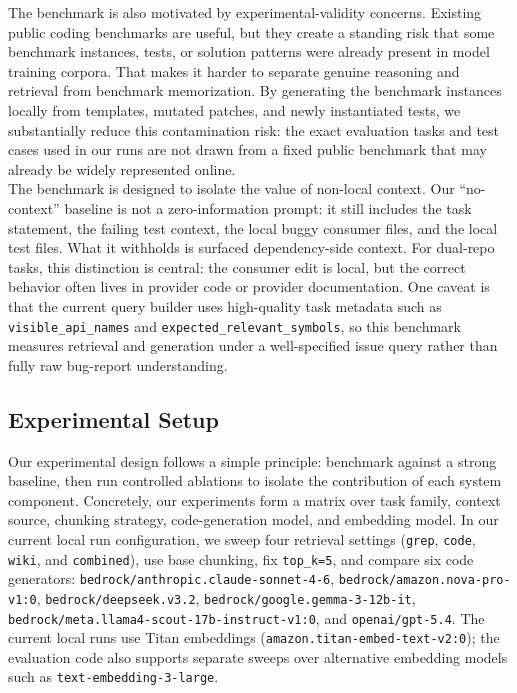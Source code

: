 \documentclass[a4paper,12pt]{article}
\begin{document}
The benchmark is also motivated by experimental-validity concerns. Existing public coding benchmarks are useful, but they create a standing risk that some benchmark instances, tests, or solution patterns were already present in model training corpora. That makes it harder to separate genuine reasoning and retrieval from benchmark memorization. By generating the benchmark instances locally from templates, mutated patches, and newly instantiated tests, we substantially reduce this contamination risk: the exact evaluation tasks and test cases used in our runs are not drawn from a fixed public benchmark that may already be widely represented online.\\

The benchmark is designed to isolate the value of non-local context. Our ``no-context'' baseline is not a zero-information prompt: it still includes the task statement, the failing test context, the local buggy consumer files, and the local test files. What it withholds is surfaced dependency-side context. For dual-repo tasks, this distinction is central: the consumer edit is local, but the correct behavior often lives in provider code or provider documentation. One caveat is that the current query builder uses high-quality task metadata such as \texttt{visible\_api\_names} and \texttt{expected\_relevant\_symbols}, so this benchmark measures retrieval and generation under a well-specified issue query rather than fully raw bug-report understanding.\\

\subsection{Experimental Setup}

Our experimental design follows a simple principle: benchmark against a strong baseline, then run controlled ablations to isolate the contribution of each system component. Concretely, our experiments form a matrix over task family, context source, chunking strategy, code-generation model, and embedding model. In our current local run configuration, we sweep four retrieval settings (\texttt{grep}, \texttt{code}, \texttt{wiki}, and \texttt{combined}), use base chunking, fix \texttt{top\_k=5}, and compare six code generators: \texttt{bedrock/anthropic.claude-sonnet-4-6}, \texttt{bedrock/amazon.nova-pro-v1:0}, \texttt{bedrock/deepseek.v3.2}, \texttt{bedrock/google.gemma-3-12b-it}, \texttt{bedrock/meta.llama4-scout-17b-instruct-v1:0}, and \texttt{openai/gpt-5.4}. The current local runs use Titan embeddings (\texttt{amazon.titan-embed-text-v2:0}); the evaluation code also supports separate sweeps over alternative embedding models such as \texttt{text-embedding-3-large}.\\
\end{document}
